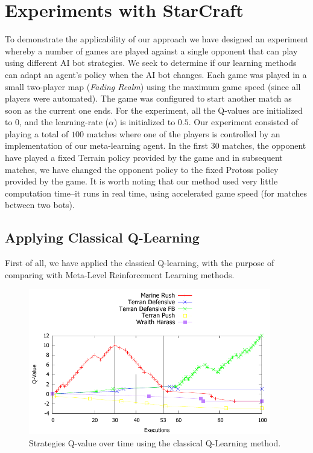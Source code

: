 \section{Experiments with StarCraft}
\label{sec:experiments}

To demonstrate the applicability of our approach we have designed an experiment whereby a number of games are played against a single opponent that can play using different AI bot strategies. 
We seek to determine if our learning methods can adapt an agent's policy when the AI bot changes. 
Each game was played in a small two-player map (\textit{Fading Realm}) using the maximum game speed (since all players were automated).
The game was configured to start another match as soon as the current one ends.
For the experiment, all the Q-values are initialized to $0$, and the learning-rate ($\alpha$) is initialized to $0.5$. 
Our experiment consisted of playing a total of $100$ matches where one of the players is controlled by an implementation of our meta-learning agent. 
In the first $30$ matches, the opponent have played a fixed Terrain policy provided by the game and in subsequent matches, we have changed the opponent policy to the fixed Protoss policy provided by the game. 
It is worth noting that our method used very little computation time--it runs in real time, using accelerated game speed (for matches between two bots).



\subsection{Applying Classical Q-Learning}
\label{subsec:applying_ql}

First of all, we have applied the classical Q-learning, with the purpose of comparing with Meta-Level Reinforcement Learning methods.

\begin{figure}[ht]
\centering
\includegraphics[width=400px]{images/q-learning_strategies_graphic}
\caption{Strategies Q-value over time using the classical Q-Learning method.}
\label{fig:q-learning_strategies_graphic}
\end{figure}

